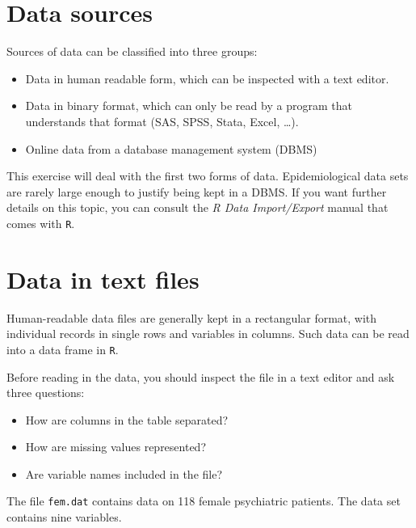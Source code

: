 \documentclass[
]{book}
\providecommand{\tightlist}{%
  \setlength{\itemsep}{0pt}\setlength{\parskip}{0pt}}
\begin{document}
\section{Data sources}\label{data-sources}

Sources of data can be classified into three groups:

\begin{itemize}
\tightlist
\item
  Data in human readable form, which can be inspected with a text editor.
\item
  Data in binary format, which can only be read by a program that
  understands that format (SAS, SPSS, Stata, Excel, \ldots).
\item
  Online data from a database management system (DBMS)
\end{itemize}

This exercise will deal with the first two forms of
data. Epidemiological data sets are rarely large enough to justify
being kept in a DBMS. If you want further details on this topic, you
can consult the \emph{R Data Import/Export} manual that comes with
\texttt{R}.

\section{Data in text files}\label{data-in-text-files}

Human-readable data files are generally kept in a rectangular format,
with individual records in single rows and variables in columns. Such
data can be read into a data frame in \texttt{R}.

Before reading in the data, you should inspect the file in a text
editor and ask three questions:

\begin{itemize}
\tightlist
\item
  How are columns in the table separated?
\item
  How are missing values represented?
\item
  Are variable names included in the file?
\end{itemize}

The file \texttt{fem.dat} contains data on 118 female psychiatric
patients. The data set contains nine variables.
\end{document}
